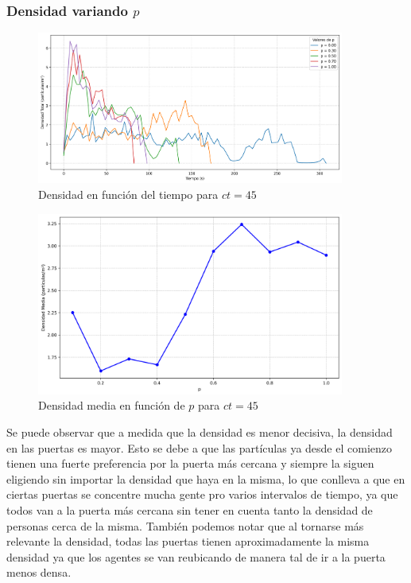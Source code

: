 \documentclass[12pt]{article}
\begin{document}
\subsubsection{Densidad variando $p$}

\begin{figure}[H]
    \centering
    \includegraphics[width=0.9\textwidth]{img/density_vs_time_t45.png}
    \caption{Densidad en función del tiempo para $ct=45$}
    \label{fig:flow_p100}
\end{figure}

\begin{figure}[H]
    \centering
    \includegraphics[width=0.9\textwidth]{img/average_density_t45.png}
    \caption{Densidad media en función de $p$ para $ct=45$}
    \label{fig:flow_p100}
\end{figure}

Se puede observar que a medida que la densidad es menor decisiva, la densidad en las puertas es mayor. Esto se debe a que las partículas ya desde el comienzo tienen una fuerte preferencia por la puerta más cercana y siempre la siguen eligiendo sin importar la densidad que haya en la misma, lo que conlleva a que en ciertas puertas se concentre mucha gente pro varios intervalos de tiempo, ya que todos van a la puerta más cercana sin tener en cuenta tanto la densidad de personas cerca de la misma. 
También podemos notar que al tornarse más relevante la densidad, todas las puertas tienen aproximadamente la misma densidad ya que los agentes se van reubicando de manera tal de ir a la puerta menos densa.
\end{document}
